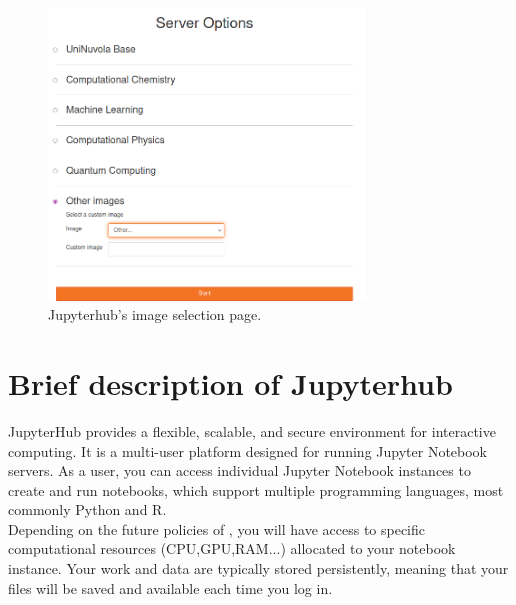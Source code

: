 \begin{figure}[htbp]
    \centering
    \includegraphics[width=0.75\textwidth]{figures/imageselecton.png}
    \caption{Jupyterhub's image selection page. }
    \label{image_selection}
\end{figure}


\section{Brief description of Jupyterhub}
JupyterHub provides a flexible, scalable, and secure environment for interactive computing. It is a multi-user platform designed for running Jupyter Notebook servers. As a user, you can access individual Jupyter Notebook instances to create and run notebooks, which support multiple programming languages, most commonly Python and R.\\ 

Depending on the future policies of \uninuvola, you will have access to specific computational resources (CPU,GPU,RAM...) allocated to your notebook instance. Your work and data are typically stored persistently, meaning that your files will be saved and available each time you log in.\\

